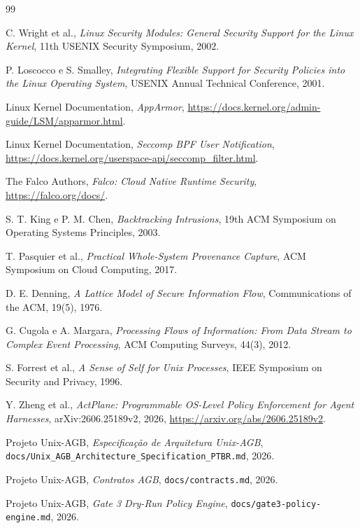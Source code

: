 \documentclass[11pt,a4paper]{article}
\begin{document}
\begin{thebibliography}{99}

C. Wright et al.,
\emph{Linux Security Modules: General Security Support for the Linux Kernel},
11th USENIX Security Symposium, 2002.

P. Loscocco e S. Smalley,
\emph{Integrating Flexible Support for Security Policies into the Linux
Operating System}, USENIX Annual Technical Conference, 2001.

Linux Kernel Documentation,
\emph{AppArmor}, \url{https://docs.kernel.org/admin-guide/LSM/apparmor.html}.

Linux Kernel Documentation,
\emph{Seccomp BPF User Notification},
\url{https://docs.kernel.org/userspace-api/seccomp_filter.html}.

The Falco Authors,
\emph{Falco: Cloud Native Runtime Security}, \url{https://falco.org/docs/}.

S. T. King e P. M. Chen,
\emph{Backtracking Intrusions}, 19th ACM Symposium on Operating Systems
Principles, 2003.

T. Pasquier et al.,
\emph{Practical Whole-System Provenance Capture}, ACM Symposium on Cloud
Computing, 2017.

D. E. Denning,
\emph{A Lattice Model of Secure Information Flow}, Communications of the ACM,
19(5), 1976.

G. Cugola e A. Margara,
\emph{Processing Flows of Information: From Data Stream to Complex Event
Processing}, ACM Computing Surveys, 44(3), 2012.

S. Forrest et al.,
\emph{A Sense of Self for Unix Processes}, IEEE Symposium on Security and
Privacy, 1996.

Y. Zheng et al.,
\emph{ActPlane: Programmable OS-Level Policy Enforcement for Agent Harnesses},
arXiv:2606.25189v2, 2026,
\url{https://arxiv.org/abs/2606.25189v2}.

Projeto Unix-AGB,
\emph{Especificação de Arquitetura Unix-AGB},
\texttt{docs/Unix\_AGB\_Architecture\_Specification\_PTBR.md}, 2026.

Projeto Unix-AGB,
\emph{Contratos AGB},
\texttt{docs/contracts.md}, 2026.

Projeto Unix-AGB,
\emph{Gate 3 Dry-Run Policy Engine},
\texttt{docs/gate3-policy-engine.md}, 2026.


\end{thebibliography}
\end{document}
